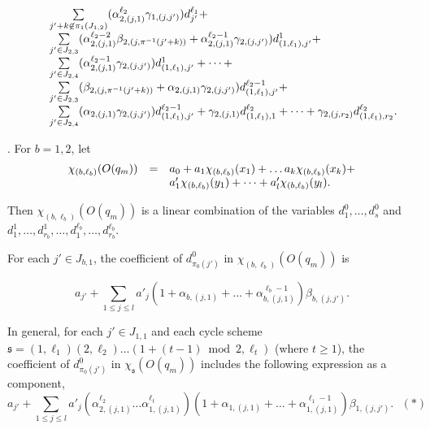\documentclass[runningheads,a4paper]{llncs}
\def\schm{{\mathfrak{s} }}
\begin{document}
{\[\begin{array}{l c l}
%
& & \sum \limits_{j'+k \not \in \pi_1(J_{1,2})} (\alpha^{\ell_2}_{2,(j,1)} \gamma_{1,(j, j')}) d^{\ell_1}_{j'}+ \\
%
& & \sum \limits_{j' \in J_{2,3}} (\alpha^{\ell_2-2}_{2,(j,1)}\beta_{2,(j, \pi^{-1}(j'+k))}+ \alpha^{\ell_2-1}_{2,(j,1)}\gamma_{2,(j,j')}) d^1_{(1,\ell_1),j'} +  \\
%
& & \sum \limits_{j' \in J_{2,4}} (\alpha^{\ell_2-1}_{2,(j,1)} \gamma_{2,(j,j')}) d^1_{(1,\ell_1),j'} + \dots + \\
%
& & \sum \limits_{j' \in J_{2,3}} (\beta_{2,(j, \pi^{-1}(j'+k))}+ \alpha_{2,(j,1)}\gamma_{2,(j,j')}) d^{\ell_2-1}_{(1,\ell_1), j'} + \\
%
& &  \sum \limits_{j' \in J_{2,4}} (\alpha_{2,(j,1)} \gamma_{2,(j,j')}) d^{\ell_2-1}_{(1,\ell_1), j'} + \gamma_{2,(j, 1)} d^{\ell_2}_{(1,\ell_1), 1} +  \dots + \gamma_{2,(j,r_2)} d^{\ell_2}_{(1,\ell_1), r_2}.
\end{array} 
\]
}

\smallskip

. For $b=1,2$, let 
\[
\begin{array}{l c l}
\chi_{(b,\ell_b)}(O(q_m)) & = & a_0 + a_1 \chi_{(b,\ell_b)}(x_1) + \dots a_k \chi_{(b,\ell_b)}(x_k) + \\
& & a'_1 \chi_{(b,\ell_b)}(y_1) + \dots + a'_l \chi_{(b,\ell_b)}(y_l).
\end{array}
\] 

Then $\chi_{(b,\ell_b)}(O(q_m))$ is a linear combination of the variables $d^0_1,\dots, d^0_s$ and $d^1_1,\dots, d^1_{r_b}, \dots, d^{\ell_b}_1,\dots, d^{\ell_b}_{r_b}$.

For each $j' \in J_{b,1}$, the coefficient of $d^0_{\pi_0(j')}$ in $\chi_{(b,\ell_b)}(O(q_m))$ is 

\[a_{j'} + \sum \limits_{1 \le j \le l} a'_j (1+\alpha_{b,(j,1)} + \dots +\alpha^{\ell_b-1}_{b,(j,1)})\beta_{b,(j,j')}.\]

In general, for each $j' \in J_{1,1}$ and each cycle scheme $\schm=(1,\ell_1)(2,\ell_2) \dots (1+(t-1) \bmod 2,\ell_{t})$ (where $t \ge 1$), the coefficient of $d^0_{\pi_0(j')}$ in $\chi_{\schm}(O(q_m))$ includes the following expression as a component,
%
\[a_{j'} + \sum \limits_{1 \le j \le l} a'_j (\alpha^{\ell_2}_{2,(j,1)} \dots \alpha^{\ell_t}_{1,(j,1)}) (1+\alpha_{1,(j,1)} + \dots +\alpha^{\ell_1-1}_{1,(j,1)})\beta_{1,(j,j')}. \ \ \  (\ast)\]
\end{document}
